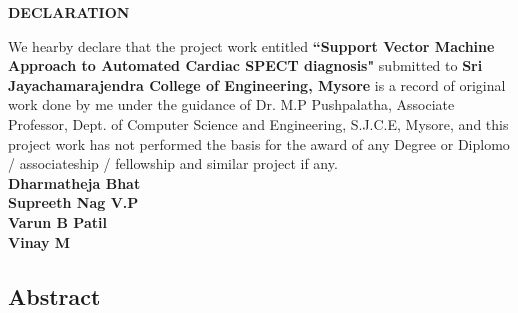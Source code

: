 \documentclass[11pt,a4paper]{report}
\begin{document}
% 



\fontsize{12}{12}	%
\selectfont

\thispagestyle{empty} %
\begin{center}
\textbf{DECLARATION}
\end{center}
\vspace{2cm}

{\justifying
\setlength{\parindent}{1cm}
We hearby declare that the project work entitled \textbf{``Support Vector Machine Approach to Automated Cardiac SPECT diagnosis"} submitted to \textbf{Sri Jayachamarajendra College of Engineering, Mysore} is a record of original work done by me under the guidance of Dr. M.P Pushpalatha, Associate Professor, Dept. of Computer Science and Engineering, S.J.C.E, Mysore, and this project work has not performed the basis for the award of any Degree or Diplomo / associateship / fellowship and similar project if any.} \\[3cm]
{\flushright
\textbf{Dharmatheja Bhat}\\
\textbf{Supreeth Nag V.P} \\
\textbf{Varun B Patil} \\
\textbf{Vinay M} \\}



\thispagestyle{empty} %
\begin{center}
\chapter*{Abstract}
\end{center}
\end{document}

